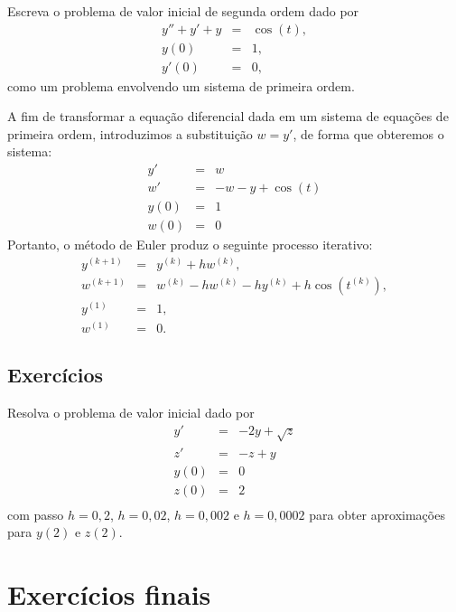 \begin{ex} Escreva o problema de valor inicial de segunda ordem dado por
\begin{eqnarray*}
y''+y'+y&=&\cos(t),\\
y(0)&=&1,\\
y'(0)&=&0,
\end{eqnarray*}
como um problema envolvendo um sistema de primeira ordem.
\end{ex}
A fim de transformar a equação diferencial dada em um sistema de equações de primeira ordem, introduzimos a substituição $w=y'$, de forma que obteremos o sistema:
\begin{eqnarray*}
y'&=&w\\
w'&=&-w-y+\cos(t)\\
y(0)&=&1\\
w(0)&=&0
\end{eqnarray*}
Portanto, o método de Euler produz o seguinte processo iterativo:
\begin{eqnarray*}
y^{(k+1)}&=&y^{(k)}+hw^{(k)},\\
w^{(k+1)}&=&w^{(k)}-hw^{(k)}-hy^{(k)}+h\cos(t^{(k)}),\\
y^{(1)}&=&1,\\
w^{(1)}&=&0.
\end{eqnarray*}


\subsection*{Exercícios}

\begin{exer}Resolva o problema de valor inicial dado por
\begin{eqnarray*}
y'&=& -2y + \sqrt{z}\\
z'&=& -z + y\\
y(0)&=&0\\
z(0)&=&2\\
\end{eqnarray*}
com passo $h=0,2$, $h=0,02$, $h=0,002$ e $h=0,0002$ para obter aproximações para $y(2)$ e $z(2)$.
\end{exer}



\section{Exercícios finais}


